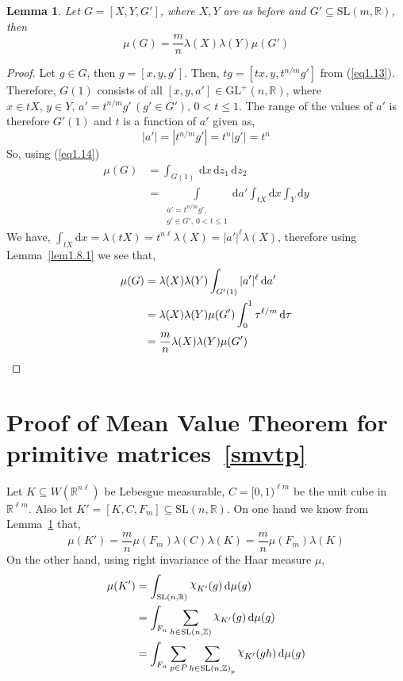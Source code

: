 \documentclass[11pt]{article}
\newtheorem{lemma}[theorem]{Lemma}
\theoremstyle{definition}
\newcommand{\mychi}{\raisebox{2pt}{$\chi$}}
\begin{document}
\begin{lemma}\label{lem1.8.2}
    Let $G=[X,Y,G']$, where $X, Y$ are as before and $G' \subseteq \mathrm{SL}(m, \mathbb{R})$, then
    \[	
        \mu (G)= \frac{m}{n} \lambda (X) \lambda (Y) \mu (G')
    \]
\end{lemma}
\begin{proof}
    Let $g\in G$, then $g=[x,y,g']$.
    Then, $tg= [tx, y, t^{n/m}g']$ from (\ref{eq1.13}).
    Therefore, $G(1)$ consists of all $[x,y, a'] \in \mathrm{GL}^+(n, \mathbb{R})$, where $x \in tX,\, y\in Y,\, a'= t^{n/m}g' \,(g' \in G'),\, 0 < t \le 1$.
    The range of the values of $a'$ is therefore $G'(1)$ and $t$ is a function of $a'$ given as,
    \[	
        |a'|= |t^{n/m}g'|=t^n |g'|=t^n
    \]
    So, using (\ref{eq1.14})
    \begin{align*}
        \mu (G)&= \int_{G(1)} \, \mathrm{d} x \, \mathrm{d} z_1 \, \mathrm{d} z_2\\
        &=\int\limits_{\substack{a' = t^{n/m}g', \\ g' \in G', \, 0 < t \le 1}} \mathrm{d} a' \int_{tX} \mathrm{d} x \int_{Y} \mathrm{d} y
    \end{align*}
    We have, $\displaystyle\int_{tX} \mathrm{d} x = \lambda (tX) = t^{n \ell} \lambda (X)= |a'|^ \ell \lambda (X)$, therefore using Lemma~\ref{lem1.8.1} we see that,
    \begin{align*}
        \mu (G)&= \lambda (X) \lambda (Y) \int_{G'(1)} |a'|^ \ell \, \mathrm{d} a'\\
        &= \lambda (X) \lambda (Y) \mu (G') \int_{0}^1 \tau ^{\ell/m} \, \mathrm{d} \tau \hfill\\
        &= \frac{m}{n} \lambda (X) \lambda (Y) \mu (G')
    \end{align*}
\end{proof}

\section{Proof of Mean Value Theorem for primitive matrices~\ref{smvtp}}\label{sec1.8}
Let $K \subseteq W(\mathbb{R}^{n\ell })$ be Lebesgue measurable, $C= [0, 1)^{\ell m}$ be the unit cube in $\mathbb{R}^{\ell m}$.
Also let $K'= [K,C,F_m] \subseteq \mathrm{SL}(n, \mathbb{R})$.
On one hand we know from Lemma~\ref{lem1.8.2} that,
\begin{equation}\label{eq1.15}
    \mu (K') = \frac{m}{n} \mu (F_m ) \lambda (C) \lambda (K)= \frac{m}{n}\mu (F_m)\lambda (K)
\end{equation}
On the other hand, using right invariance of the Haar measure $\mu$,
\begin{align}\label{eq1.16}
    \mu (K')&= \int_{\mathrm{SL}(n, \mathbb{R})}\mychi _{K'}(g) \, \mathrm{d} \mu (g) \nonumber \\
    &= \int_{F_n} \sum_{h \in \mathrm{SL}(n, \mathbb{Z})} \mychi _{K'}(g) \, \mathrm{d} \mu (g) \nonumber\\
    &= \int_{F_n} \sum_{p \in P} \sum_{h \in {\mathrm{SL}(n, \mathbb{Z})}_p} \mychi _{K'}(gh) \, \mathrm{d} \mu (g)
\end{align}
\end{document}
